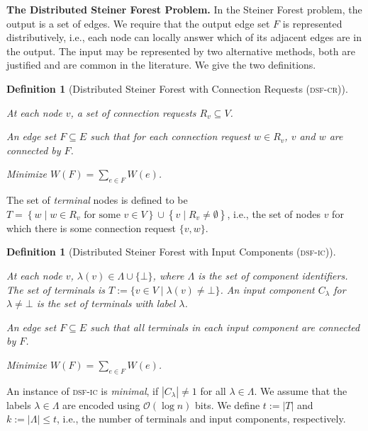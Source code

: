 \documentclass[letterpaper,11pt]{article}
\newtheorem{definition}[theorem]{Definition}
\newcommand{\BO}{\mathcal{O}}
\newcommand{\Comp}{\lambda}
\newcommand{\Set}[1]{\left\{#1\right\}}
\newcommand{\sfcr}{\textsc{dsf-cr}\xspace}
\newcommand{\sfic}{\textsc{dsf-ic}\xspace}
\renewcommand{\paragraph}[1]{\smallskip\par\noindent\textbf{#1}}
\begin{document}
\paragraph{The Distributed Steiner Forest Problem.}
In the Steiner Forest problem, the output is a set of edges. We
require that the output edge set $F$ is represented distributively,
i.e., each node 
can locally answer which of its adjacent 
edges are in the output.
The input may be represented by two alternative methods, both are
justified and are common in the
literature. We give the two definitions.
\begin{definition}
[Distributed Steiner Forest with Connection Requests (\sfcr)]\ 
\begin{compactitem}
\item[\textbf{Input:}] At each node $v$, a set of \emph{connection
    requests} $R_v\subseteq V$.
\item[\textbf{Output:}] An edge set $F\subseteq E$ such that
  for each connection request $w\in R_v$, $v$ and $w$ are connected by
$F$.
\item[\textbf{Goal:}] Minimize $W(F)=\sum_{e\in F}W(e)$.
\end{compactitem}
\end{definition}
\noindent


The set of \emph{terminal} nodes is defined to be $T=\Set{w\mid w\in
  R_v\mbox{ for some }v\in V}\cup \Set{v\mid R_v\ne\emptyset}$, i.e., the
set of nodes $v$ for which there is some connection request $\{v,w\}$.

\begin{definition}[Distributed Steiner Forest with Input Components (\sfic)]\ 
\begin{compactitem}
\item[\textbf{Input:}] At each node $v$, $\Comp(v)\in \Lambda \cup
  \{\bot\}$, where $\Lambda$ is the set of \emph{component
    identifiers}. The set of \emph{terminals} is $T:=\{v\in
V\mid\Comp(v)\neq \bot\}$. An \emph{input component} $C_{\Comp}$ for
$\lambda\ne\bot$ is the set of terminals with label $\Comp$.
\item[\textbf{Output:}] An edge set $F\subseteq E$ such that all terminals
  in each
  {input component}  are connected by $F$.
\item[\textbf{Goal:}] Minimize $W(F)=\sum_{e\in F}W(e)$.
\end{compactitem}
\end{definition}
An instance of \sfic is \emph{minimal}, if $|C_{\Comp}|\neq 1$ for all
$\Comp\in \Lambda$. We assume that the labels $\Comp\in \Lambda$ are encoded
using $\BO(\log n)$ bits. We define $t:=|T|$ and $k:=|\Lambda|\leq
t$, i.e., the number of terminals and input components, respectively. 
\end{document}

